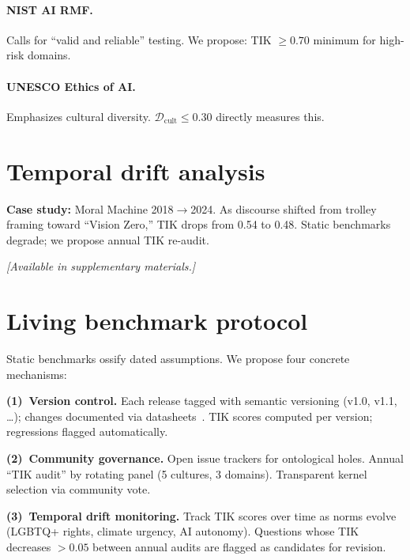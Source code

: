 \documentclass[11pt]{article}
\begin{document}
\paragraph{NIST AI RMF.} Calls for ``valid and reliable'' testing. We propose: TIK $\geq 0.70$ minimum for high-risk domains.

\paragraph{UNESCO Ethics of AI.} Emphasizes cultural diversity. $\mathcal{D}_{\text{cult}} \leq 0.30$ directly measures this.


\section{Temporal drift analysis}
\label{app:temporal}

\textbf{Case study:} Moral Machine 2018$\to$2024. As discourse shifted from trolley framing toward ``Vision Zero,'' TIK drops from 0.54 to 0.48. Static benchmarks degrade; we propose annual TIK re-audit.

\textit{[Available in supplementary materials.]}


\section{Living benchmark protocol}
\label{app:living}

Static benchmarks ossify dated assumptions. We propose four concrete mechanisms:

\textbf{(1)~Version control.} Each release tagged with semantic versioning (v1.0, v1.1, \ldots); changes documented via datasheets~\citep{gebru2021datasheets}. TIK scores computed per version; regressions flagged automatically.

\textbf{(2)~Community governance.} Open issue trackers for ontological holes. Annual ``TIK audit'' by rotating panel (5 cultures, 3 domains). Transparent kernel selection via community vote.

\textbf{(3)~Temporal drift monitoring.} Track TIK scores over time as norms evolve (LGBTQ+ rights, climate urgency, AI autonomy). Questions whose TIK decreases $> 0.05$ between annual audits are flagged as candidates for revision.
\end{document}
